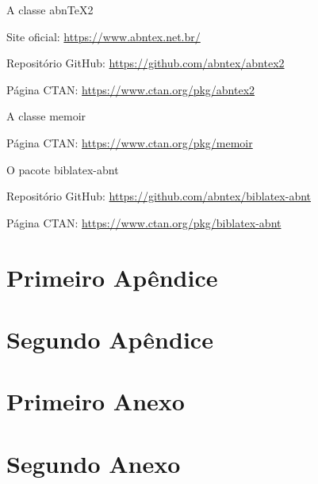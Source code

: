 \documentclass[
	12pt,    %
	oneside, %
	a4paper, %
	chapter=TITLE, %
	section=TITLE, %
	sumario=tradicional, %
	english, %
	brazil   %
] {abntex2}
\begin{document}
	\begin{alineas}
		\item A classe \textsf{abn\TeX 2} 
			\begin{alineas}
				\item Site oficial: \url{https://www.abntex.net.br/}
				\item Repositório GitHub: \url{https://github.com/abntex/abntex2}
				\item Página \textsf{CTAN}: \url{https://www.ctan.org/pkg/abntex2}
			\end{alineas}
			
		\item A classe \textsf{memoir} 
			\begin{alineas}
				\item Página \textsf{CTAN}: \url{https://www.ctan.org/pkg/memoir}
			\end{alineas}

		\item O pacote \textsf{biblatex-abnt}
			\begin{alineas}
				\item Repositório GitHub: \url{https://github.com/abntex/biblatex-abnt}			
				\item Página \textsf{CTAN}: \url{https://www.ctan.org/pkg/biblatex-abnt}
			\end{alineas}
	\end{alineas}

	\postextual

	\linespread{1}
	\printbibliography[title={REFERÊNCIAS BIBLIOGRÁFICAS}]
	
	\begin{apendicesenv}		
		\partapendices	
		\chapter{Primeiro Apêndice}
		\chapter{Segundo Apêndice}		
	\end{apendicesenv}
	
	\begin{anexosenv}
		\partanexos
		\chapter{Primeiro Anexo}
		\chapter{Segundo Anexo}		
	\end{anexosenv}
	
\end{document}
